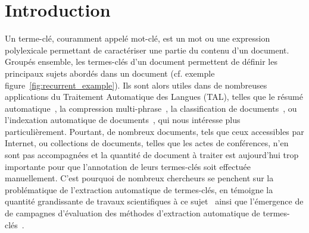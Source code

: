 \section{Introduction}
\label{sec:introduction}
  Un terme-clé, couramment appelé mot-clé, est un mot ou une expression
  polylexicale permettant de caractériser une partie du contenu d'un document.
  Groupés ensemble, les termes-clés d'un document permettent de définir les
  principaux sujets abordés dans un document (cf. exemple
  figure~\ref{fig:recurrent_example}). Ils sont alors utiles dans de
  nombreuses applications du Traitement Automatique des Langues (TAL), telles
  que  le résumé automatique~\cite{avanzo2005keyphrase}, la compression
  multi-phrase~\cite{boudin2013multisentencecompression}, la classification de
  documents~\cite{han2007webdocumentclustering}, ou l'indexation automatique de
  documents~\cite{medelyan2008smalltrainingset}, qui nous intéresse plus
  particulièrement. Pourtant, de nombreux documents, tels que ceux accessibles
  par Internet, ou collections de documents, telles que les actes de
  conférences, n'en sont pas accompagnées et la quantité de document à traiter
  est aujourd'hui trop importante pour que l'annotation de leurs termes-clés
  soit effectuée manuellement. C'est pourquoi de nombreux chercheurs se penchent
  sur la problématique de l'extraction automatique de termes-clés, en témoigne
  la quantité grandissante de travaux scientifiques à ce
  sujet~\cite{hasan2014state_of_the_art} ainsi que l'émergence de  de campagnes
  d'évaluation des méthodes d'extraction automatique de
  termes-clés~\cite{kim2010semeval,paroubek2012deft}.

